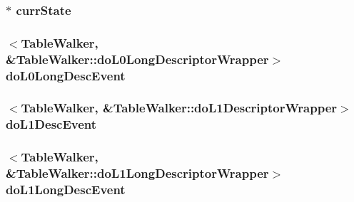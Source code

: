 \label{classArmISA_1_1TableWalker_a937afcdcc940e8070627553eaebfa58a}
\hypertarget{classArmISA_1_1TableWalker_a5d1a85a0248e318a8191d54988c8782d}{
\subsubsection[{currState}]{$\ast$ {\bf currState}}}
\label{classArmISA_1_1TableWalker_a5d1a85a0248e318a8191d54988c8782d}
\hypertarget{classArmISA_1_1TableWalker_a263fa19a40da797a24e51a5edafd9215}{
\subsubsection[{doL0LongDescEvent}]{$<${\bf TableWalker}, \&TableWalker::doL0LongDescriptorWrapper$>$ {\bf doL0LongDescEvent}}}
\label{classArmISA_1_1TableWalker_a263fa19a40da797a24e51a5edafd9215}
\hypertarget{classArmISA_1_1TableWalker_a896d858298222a8d8c96bc69f7db1d84}{
\subsubsection[{doL1DescEvent}]{$<${\bf TableWalker}, \&TableWalker::doL1DescriptorWrapper$>$ {\bf doL1DescEvent}}}
\label{classArmISA_1_1TableWalker_a896d858298222a8d8c96bc69f7db1d84}
\hypertarget{classArmISA_1_1TableWalker_a5ab01b63bbaded2920f4e72569b63759}{
\subsubsection[{doL1LongDescEvent}]{$<${\bf TableWalker}, \&TableWalker::doL1LongDescriptorWrapper$>$ {\bf doL1LongDescEvent}}}
